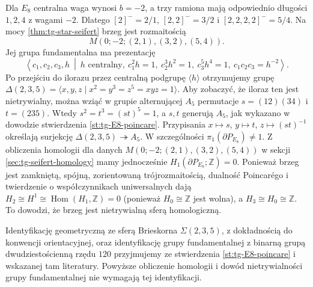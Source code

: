 \begin{przyklad}
\label{ex:tg-seifert-E8}
Dla $E_8$ centralna waga wynosi $b=-2$,
a trzy ramiona mają odpowiednio długości $1,2,4$
z wagami $-2$. Dlatego
$[2]^-=2/1$, $[2,2]^-=3/2$ i
$[2,2,2,2]^-=5/4$. Na mocy
\ref{thm:tg-star-seifert} brzeg jest rozmaitością
\[
M(0;-2;(2,1),(3,2),(5,4)).
\]
Jej grupa fundamentalna ma prezentację
\[
\left\langle c_1,c_2,c_3,h\ \middle|\
h\text{ centralny},\ c_1^2h=1,\ c_2^3h^2=1,
\ c_3^5h^4=1,\ c_1c_2c_3=h^{-2}\right\rangle.
\]
Po przejściu do ilorazu przez centralną podgrupę
$\langle h\rangle$ otrzymujemy grupę
$\Delta(2,3,5)=\langle x,y,z\mid x^2=y^3=z^5=xyz=1\rangle$.
Aby zobaczyć, że iloraz ten jest nietrywialny,
można wziąć w grupie alternującej $A_5$ permutacje
$s=(12)(34)$ i $t=(235)$. Wtedy $s^2=t^3=(st)^5=1$,
a $s,t$ generują $A_5$, jak wykazano w dowodzie
stwierdzenia \ref{st:tg-E8-poincare}. Przypisania
$x\mapsto s$, $y\mapsto t$, $z\mapsto(st)^{-1}$
określają surjekcję $\Delta(2,3,5)\twoheadrightarrow A_5$.
W szczególności $\pi_1(\partial P_{E_8})\ne1$.
Z obliczenia homologii dla danych
$M(0;-2;(2,1),(3,2),(5,4))$ w sekcji
\ref{sec:tg-seifert-homology} mamy jednocześnie
$H_1(\partial P_{E_8};\mathbb Z)=0$.
Ponieważ brzeg jest zamkniętą, spójną, zorientowaną
trójrozmaitością, dualność Poincarégo i twierdzenie
o współczynnikach uniwersalnych dają
$H_2\cong H^1\cong\operatorname{Hom}(H_1,\mathbb Z)=0$
(ponieważ $H_0\cong\mathbb Z$ jest wolna), a
$H_3\cong H_0\cong\mathbb Z$. To dowodzi, że brzeg
jest nietrywialną sferą homologiczną.

Identyfikację geometryczną ze sferą Brieskorna
$\Sigma(2,3,5)$, z dokładnością do konwencji
orientacyjnej, oraz identyfikację grupy fundamentalnej
z binarną grupą dwudziestościenną rzędu $120$
przyjmujemy ze stwierdzenia \ref{st:tg-E8-poincare}
i wskazanej tam literatury. Powyższe obliczenie homologii
i dowód nietrywialności grupy fundamentalnej nie
wymagają tej identyfikacji.
\end{przyklad}

